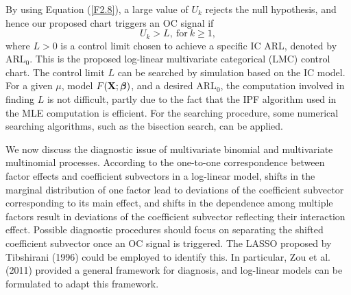 By using Equation (\ref{F2.8}), a large value of $U_k$ rejects the null hypothesis,
and hence our proposed chart triggers an OC signal if
\[
U_k>L,\  \mbox{for}\  k\geq 1,
\]
where $L>0$ is a control limit chosen to achieve a specific IC ARL, denoted by
ARL$_0$. This is the proposed log-linear multivariate categorical (LMC) control
chart. The control limit $L$ can be searched by simulation based on the IC model.
For a given $\mu$, model $F({\bf X};\boldsymbol\beta)$, and a desired ARL$_0$, the
computation involved in finding $L$ is not difficult, partly due to the fact that
the IPF algorithm used in the MLE computation is efficient. For the searching
procedure, some numerical searching algorithms, such as the bisection search, can be
applied.

We now discuss the diagnostic issue of multivariate binomial and multivariate
multinomial processes. According to the one-to-one correspondence between factor
effects and coefficient subvectors in a log-linear model, shifts in the marginal
distribution of one factor lead to deviations of the coefficient subvector
corresponding to its main effect, and shifts in the dependence among multiple
factors result in deviations of the coefficient subvector reflecting their
interaction effect. Possible diagnostic procedures should focus on separating the
shifted coefficient subvector once an OC signal is triggered. The LASSO proposed by
Tibshirani (1996) could be employed to identify this. In particular, Zou et al.
(2011) provided a general framework for diagnosis, and log-linear models can be
formulated to adapt this framework.


